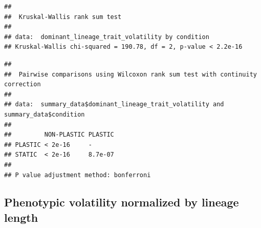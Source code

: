 \documentclass[]{book}
\newenvironment{Shaded}{\begin{snugshade}}{\end{snugshade}}
\newcommand{\DataTypeTok}[1]{\textcolor[rgb]{0.13,0.29,0.53}{#1}}
\newcommand{\KeywordTok}[1]{\textcolor[rgb]{0.13,0.29,0.53}{\textbf{#1}}}
\newcommand{\NormalTok}[1]{#1}
\newcommand{\OperatorTok}[1]{\textcolor[rgb]{0.81,0.36,0.00}{\textbf{#1}}}
\newcommand{\StringTok}[1]{\textcolor[rgb]{0.31,0.60,0.02}{#1}}
\begin{document}
\begin{verbatim}
## 
##  Kruskal-Wallis rank sum test
## 
## data:  dominant_lineage_trait_volatility by condition
## Kruskal-Wallis chi-squared = 190.78, df = 2, p-value < 2.2e-16
\end{verbatim}

\begin{Shaded}
\end{Shaded}

\begin{verbatim}
## 
##  Pairwise comparisons using Wilcoxon rank sum test with continuity correction 
## 
## data:  summary_data$dominant_lineage_trait_volatility and summary_data$condition 
## 
##         NON-PLASTIC PLASTIC
## PLASTIC < 2e-16     -      
## STATIC  < 2e-16     8.7e-07
## 
## P value adjustment method: bonferroni
\end{verbatim}

\hypertarget{phenotypic-volatility-normalized-by-lineage-length}{%
\subsection{Phenotypic volatility normalized by lineage length}\label{phenotypic-volatility-normalized-by-lineage-length}}
\end{document}

